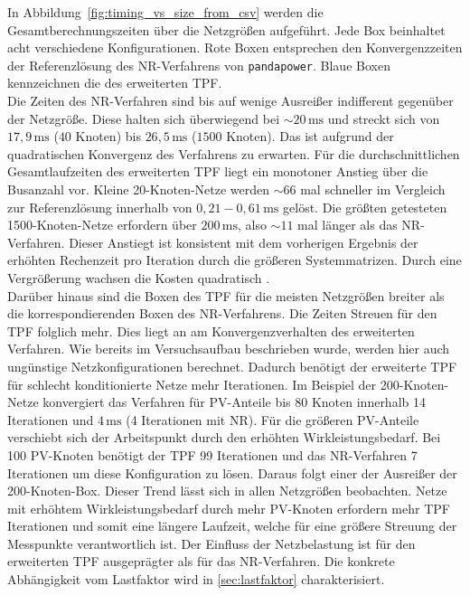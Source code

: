 In Abbildung~\ref{fig:timing_vs_size_from_csv} werden die Gesamtberechnungszeiten über die Netzgrößen aufgeführt.
Jede Box beinhaltet acht verschiedene Konfigurationen.
Rote Boxen entsprechen den Konvergenzzeiten der Referenzlösung des NR-Verfahrens von \texttt{pandapower}.
Blaue Boxen kennzeichnen die des erweiterten TPF.\\

Die Zeiten des NR-Verfahren sind bis auf wenige Ausreißer indifferent gegenüber der Netzgröße. 
Diese halten sich überwiegend bei $\sim 20\,\mathrm{ms}$ und streckt sich von $17{,}9\,\mathrm{ms}$
($40$ Knoten) bis $26{,}5\,\mathrm{ms}$ ($1500$ Knoten).
Das ist aufgrund der quadratischen Konvergenz des Verfahrens zu erwarten.
Für die durchschnittlichen Gesamtlaufzeiten des erweiterten TPF liegt ein monotoner Anstieg über die Busanzahl vor.
Kleine 20-Knoten-Netze werden $\sim66$ mal schneller im Vergleich zur Referenzlösung innerhalb von $0,21 - 0,61\,\mathrm{ms}$ gelöst.
Die größten getesteten 1500-Knoten-Netze erfordern über $200\,\mathrm{ms}$, also $\sim11$ mal länger als das NR-Verfahren.
Dieser Anstiegt ist konsistent mit dem vorherigen Ergebnis der erhöhten Rechenzeit pro Iteration durch die größeren Systemmatrizen.
Durch eine Vergrößerung wachsen die Kosten quadratisch \cite{bibid}.\\

Darüber hinaus sind die Boxen des TPF für die meisten Netzgrößen breiter als die korrespondierenden Boxen des NR-Verfahrens.
Die Zeiten Streuen für den TPF folglich mehr.
Dies liegt an am Konvergenzverhalten des erweiterten Verfahren. 
Wie bereits im Versuchsaufbau beschrieben wurde, werden hier auch ungünstige Netzkonfigurationen berechnet.
Dadurch benötigt der erweiterte TPF für schlecht konditionierte Netze mehr Iterationen.
Im Beispiel der 200-Knoten-Netze konvergiert das Verfahren für PV-Anteile bis 80 Knoten innerhalb 14 Iterationen und  $4\,\mathrm{ms}$ (4 Iterationen mit NR).
Für die größeren PV-Anteile verschiebt sich der Arbeitspunkt durch den erhöhten Wirkleistungsbedarf.
Bei 100 PV-Knoten benötigt der TPF 99 Iterationen und das NR-Verfahren 7 Iterationen um diese Konfiguration zu lösen.
Daraus folgt einer der Ausreißer der 200-Knoten-Box.
Dieser Trend lässt sich in allen Netzgrößen beobachten. 
Netze mit erhöhtem Wirkleistungsbedarf durch mehr PV-Knoten erfordern mehr TPF Iterationen und somit eine längere Laufzeit, welche für eine größere Streuung der Messpunkte verantwortlich ist.
Der Einfluss der Netzbelastung ist für den erweiterten TPF ausgeprägter als für das NR-Verfahren. 
Die konkrete Abhängigkeit vom Lastfaktor wird in \cref{sec:lastfaktor} charakterisiert.\\

